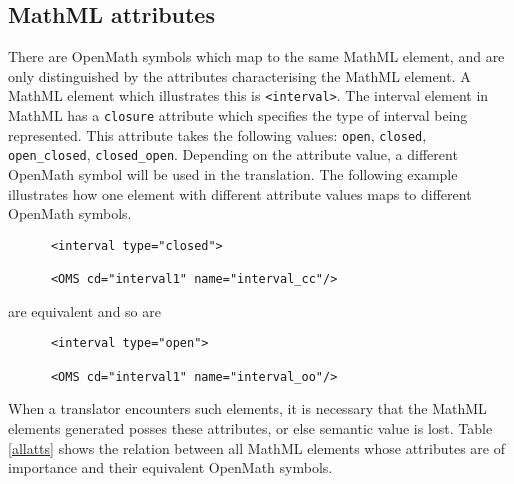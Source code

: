 \subsection{MathML attributes}

There are OpenMath symbols which map to the same MathML element, and
are only distinguished by the attributes characterising the MathML
element. A MathML element which illustrates this is \verb|<interval>|.
The interval element in MathML has a \verb|closure| attribute which
specifies the type of interval being represented. This attribute takes
the following values:  \verb|open|, \verb|closed|, \verb|open_closed|,
\verb|closed_open|.  Depending on the attribute value, a different
OpenMath symbol will be used in the translation. The following example
illustrates how one element with different attribute values maps to
different OpenMath symbols.

\begin{center}

\begin{verbatim}
      <interval type="closed">

      <OMS cd="interval1" name="interval_cc"/>
\end{verbatim}

\end{center}

\noindent are equivalent and so are

\begin{center}

\begin{verbatim}
      <interval type="open">

      <OMS cd="interval1" name="interval_oo"/>
\end{verbatim}

\end{center}

When a translator encounters such elements, it is necessary that the
MathML elements generated posses these attributes, or else semantic
value is lost. Table \ref{allatts} shows the relation between all
MathML elements whose attributes are of importance and their equivalent
OpenMath symbols.

